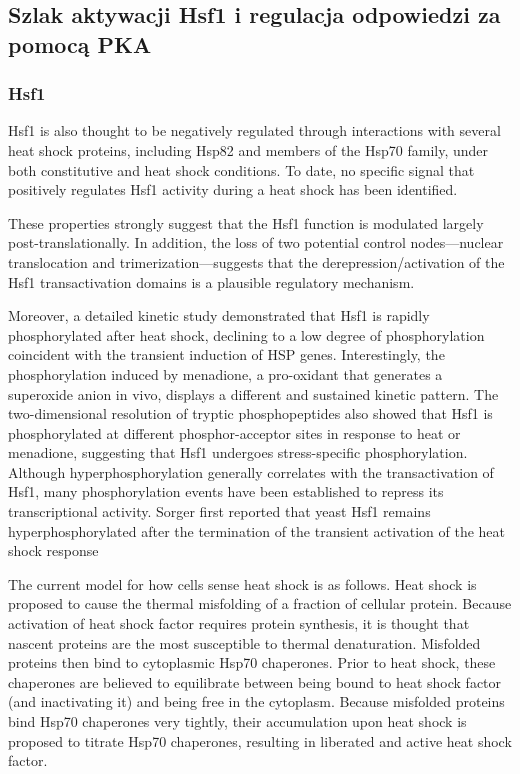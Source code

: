 \documentclass{pracamgr}
\begin{document}
\subsection{Szlak aktywacji Hsf1 i regulacja odpowiedzi za pomocą PKA}
\subsubsection{Hsf1}
Hsf1 is also thought to be negatively regulated
through interactions with several heat shock proteins, including
Hsp82 and members of the Hsp70 family, under both
constitutive and heat shock conditions. To
date, no specific signal that positively regulates Hsf1 activity
during a heat shock has been identified.\cite{TrehaloseRegulatorHsf}

These properties
strongly suggest that the Hsf1 function is modulated largely post-translationally. 
In addition, the loss of two potential control
nodes—nuclear translocation and trimerization—suggests that
the derepression/activation of the Hsf1 transactivation domains is
a plausible regulatory mechanism.\cite{Bible}

 Moreover, a detailed kinetic study 
 demonstrated that Hsf1 is rapidly phosphorylated after heat shock,
declining to a low degree of phosphorylation coincident with the
transient induction of HSP genes. Interestingly, the 
phosphorylation induced by menadione, a pro-oxidant that generates
a superoxide anion in vivo, displays a different and sustained 
kinetic pattern. The two-dimensional resolution of tryptic
phosphopeptides also showed that Hsf1 is phosphorylated at different
phosphor-acceptor sites in response to heat or menadione,
suggesting that Hsf1 undergoes stress-specific phosphorylation.
Although hyperphosphorylation generally correlates with the
transactivation of Hsf1, many phosphorylation events have been
established to repress its transcriptional activity. Sorger first
reported that yeast Hsf1 remains hyperphosphorylated after
the termination of the transient activation of the heat shock response\cite{Bible}


The current model for how cells sense heat shock is as follows.
Heat shock is proposed to cause
the thermal misfolding of a fraction of cellular protein. Because
activation of heat shock factor requires protein synthesis, it is
thought that nascent proteins are the most susceptible to 
thermal denaturation. Misfolded proteins then bind to cytoplasmic
Hsp70 chaperones. Prior to heat shock, these chaperones are
believed to equilibrate between being bound to heat shock
factor (and inactivating it) and being free in the cytoplasm.
Because misfolded proteins bind Hsp70 chaperones very
tightly, their accumulation upon heat shock is proposed to
titrate Hsp70 chaperones, resulting in liberated and active
heat shock factor.\cite{MisfoldedProteins}
\end{document}
